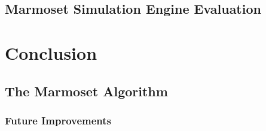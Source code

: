 \documentclass[ %
                    author={Alexander Hill},
                supervisor={Dr. Benjamin Sach},
                    degree={MEng},
                     title={MARMOSET},
                  subtitle={Multi-Agent Route Management using Online Simulation for Efficient Transportation},
                      type={research},
                      year={2016} ]{dissertation}
\begin{document}
\section{Marmoset Simulation Engine Evaluation}






\chapter{Conclusion}
\label{chap:conclusion}

\section{The Marmoset Algorithm}

\subsection{Future Improvements}
\end{document}
